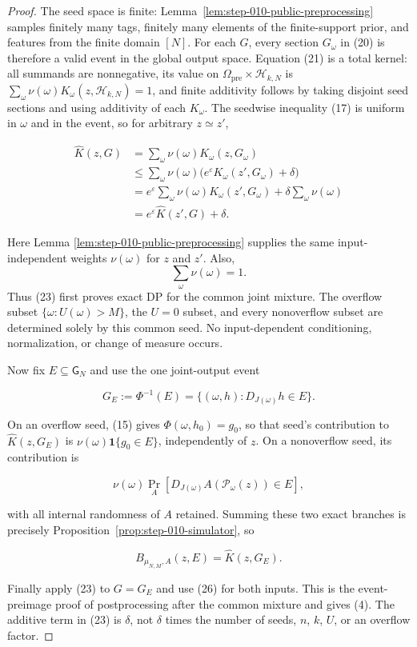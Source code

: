 \begin{proof}
The seed space is finite: Lemma~\ref{lem:step-010-public-preprocessing}
samples finitely many tags,
finitely many elements of the finite-support prior, and features from the
finite domain \([N]\).  For each \(G\), every section \(G_\omega\) in
(20) is therefore a valid event in the global output space.  Equation
(21) is a total kernel: all summands are nonnegative, its value on
\(\mathsf\Omega_{\mathrm{pre}}\times\mathcal H_{k,N}\) is
\(\sum_\omega\nu(\omega)K_\omega(z,\mathcal H_{k,N})=1\), and finite
additivity follows by taking disjoint seed sections and using additivity of
each \(K_\omega\).  The seedwise inequality (17) is uniform in \(\omega\)
and in the event, so for arbitrary \(z\simeq z'\),

\[
\begin{aligned}
  \widehat K(z,G)
  &=\sum_\omega\nu(\omega)K_\omega(z,G_\omega)\\
  &\le\sum_\omega\nu(\omega)
       \bigl(e^\varepsilon K_\omega(z',G_\omega)+\delta\bigr)\\
  &=e^\varepsilon\sum_\omega\nu(\omega)K_\omega(z',G_\omega)
    +\delta\sum_\omega\nu(\omega)\\
  &=e^\varepsilon\widehat K(z',G)+\delta.
\end{aligned}
\tag{23}
\]

Here Lemma \ref{lem:step-010-public-preprocessing} supplies the
same input-independent weights \(\nu(\omega)\) for \(z\) and \(z'\).  Also,
\[
\sum_\omega\nu(\omega)=1.
\]
Thus (23) first proves exact DP for the
common joint mixture.  The overflow subset
\(\{\omega:U(\omega)>M\}\), the \(U=0\) subset, and every nonoverflow
subset are determined solely by this common seed.  No input-dependent
conditioning, normalization, or change of measure occurs.

Now fix \(E\subseteq\mathsf G_N\) and use the one joint-output event

\[
  G_E:=\Phi^{-1}(E)
  =\{(\omega,h):D_{J(\omega)}h\in E\}.
\tag{24}
\]

On an overflow seed, (15) gives \(\Phi(\omega,h_0)=g_0\), so that seed's
contribution to \(\widehat K(z,G_E)\) is
\(\nu(\omega)\mathbf1\{g_0\in E\}\), independently of \(z\).  On a
nonoverflow seed, its contribution is

\[
  \nu(\omega)\Pr_A\!\left[
    D_{J(\omega)}A(\mathcal P_\omega(z))\in E
  \right],
\tag{25}
\]

with all internal randomness of \(A\) retained.  Summing these two exact
branches is precisely Proposition~\ref{prop:step-010-simulator},
so

\[
  B_{\mu_{N,M},A}(z,E)=\widehat K(z,G_E).
\tag{26}
\]

Finally apply (23) to \(G=G_E\) and use (26) for both inputs.  This is the
event-preimage proof of postprocessing after the common mixture and gives
(4).  The additive term in (23) is \(\delta\), not \(\delta\) times the
number of seeds, \(n\), \(k\), \(U\), or an overflow factor. \end{proof}

